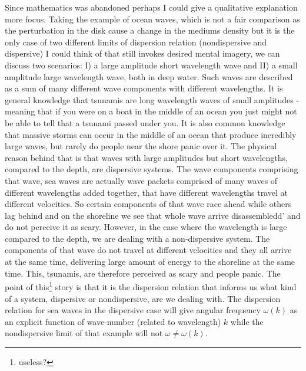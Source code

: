 \documentclass[12pt]{article}
\begin{document}
Since mathematics was abandoned perhaps I could give a qualitative explanation more focus. Taking the example of ocean waves, which is not a fair comparison as the perturbation in the disk cause a change in the mediums density but it is the only case of two different limits of dispersion relation (nondispersive and dispersive)  I could think of that still invokes desired mental imagery, we can discuss two scenarios: I) a large amplitude short wavelength wave and II) a small amplitude large wavelength wave, both in deep water. Such waves are described as a sum of many different wave components with different wavelengths. It is general knowledge that tsunamis are long wavelength waves of small amplitudes - meaning that if you were on a boat in the middle of an ocean you just might not be able to tell that a tsunami passed under you. It is also common knowledge that massive storms can occur in the middle of an ocean that produce incredibly large waves, but rarely do people near the shore panic over it. The physical reason behind that is that waves with large amplitudes but short wavelengths, compared to the depth, are dispersive systems. The wave components comprising that wave, sea waves are actually wave packets comprised of many waves of different wavelengths added together, that have different wavelengths travel at different velocities. So certain components of that wave race ahead while others lag behind and on the shoreline we see that whole wave arrive disassembledd' and do not perceive it as scary. However, in the case where the wavelength is large compared to the depth, we are dealing with a non-dispersive system. The components of that wave do not travel at different velocities and they all arrive at the same time, delivering large amount of energy to the shoreline at the same time. This, tsunamis, are therefore perceived as scary and people panic. The point of this\footnote{useless?} story is that it is the dispersion relation that informs us what kind of a system, dispersive or nondispersive, are we dealing with. The dispersion relation for sea waves in the dispersive case will give angular frequency $\omega(k)$ as an explicit function of wave-number (related to wavelength) $k$ while the nondispersive limit of that example will not $\omega\ne\omega(k)$. 
\end{document}
